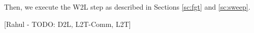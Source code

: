 

Then, we execute the W2L step as described in Sections \ref{sc:fgt} and \ref{sc:sweep}. 

[Rahul - TODO: D2L, L2T-Comm, L2T]

%
%


